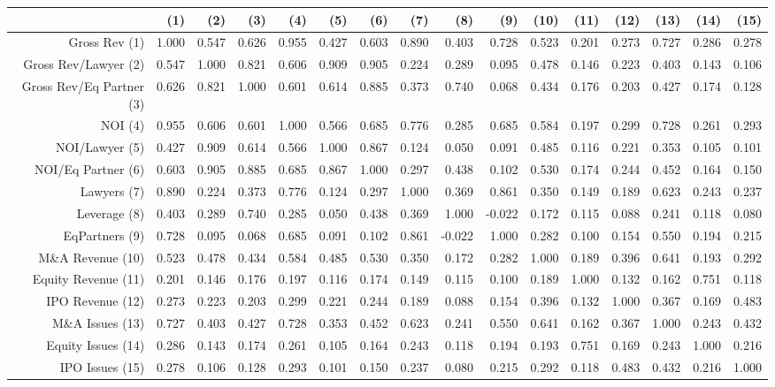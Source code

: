 \begin{table}[ht]
\centering
\begin{tabular}{rrrrrrrrrrrrrrrr}
  \hline
 & (1) & (2) & (3) & (4) & (5) & (6) & (7) & (8) & (9) & (10) & (11) & (12) & (13) & (14) & (15) \\ 
  \hline
Gross Rev (1) & 1.000 & 0.547 & 0.626 & 0.955 & 0.427 & 0.603 & 0.890 & 0.403 & 0.728 & 0.523 & 0.201 & 0.273 & 0.727 & 0.286 & 0.278 \\ 
  Gross Rev/Lawyer (2) & 0.547 & 1.000 & 0.821 & 0.606 & 0.909 & 0.905 & 0.224 & 0.289 & 0.095 & 0.478 & 0.146 & 0.223 & 0.403 & 0.143 & 0.106 \\ 
  Gross Rev/Eq Partner (3) & 0.626 & 0.821 & 1.000 & 0.601 & 0.614 & 0.885 & 0.373 & 0.740 & 0.068 & 0.434 & 0.176 & 0.203 & 0.427 & 0.174 & 0.128 \\ 
  NOI (4) & 0.955 & 0.606 & 0.601 & 1.000 & 0.566 & 0.685 & 0.776 & 0.285 & 0.685 & 0.584 & 0.197 & 0.299 & 0.728 & 0.261 & 0.293 \\ 
  NOI/Lawyer (5) & 0.427 & 0.909 & 0.614 & 0.566 & 1.000 & 0.867 & 0.124 & 0.050 & 0.091 & 0.485 & 0.116 & 0.221 & 0.353 & 0.105 & 0.101 \\ 
  NOI/Eq Partner (6) & 0.603 & 0.905 & 0.885 & 0.685 & 0.867 & 1.000 & 0.297 & 0.438 & 0.102 & 0.530 & 0.174 & 0.244 & 0.452 & 0.164 & 0.150 \\ 
  Lawyers (7) & 0.890 & 0.224 & 0.373 & 0.776 & 0.124 & 0.297 & 1.000 & 0.369 & 0.861 & 0.350 & 0.149 & 0.189 & 0.623 & 0.243 & 0.237 \\ 
  Leverage (8) & 0.403 & 0.289 & 0.740 & 0.285 & 0.050 & 0.438 & 0.369 & 1.000 & -0.022 & 0.172 & 0.115 & 0.088 & 0.241 & 0.118 & 0.080 \\ 
  EqPartners (9) & 0.728 & 0.095 & 0.068 & 0.685 & 0.091 & 0.102 & 0.861 & -0.022 & 1.000 & 0.282 & 0.100 & 0.154 & 0.550 & 0.194 & 0.215 \\ 
  M\&A Revenue (10) & 0.523 & 0.478 & 0.434 & 0.584 & 0.485 & 0.530 & 0.350 & 0.172 & 0.282 & 1.000 & 0.189 & 0.396 & 0.641 & 0.193 & 0.292 \\ 
  Equity Revenue (11) & 0.201 & 0.146 & 0.176 & 0.197 & 0.116 & 0.174 & 0.149 & 0.115 & 0.100 & 0.189 & 1.000 & 0.132 & 0.162 & 0.751 & 0.118 \\ 
  IPO Revenue (12) & 0.273 & 0.223 & 0.203 & 0.299 & 0.221 & 0.244 & 0.189 & 0.088 & 0.154 & 0.396 & 0.132 & 1.000 & 0.367 & 0.169 & 0.483 \\ 
  M\&A Issues (13) & 0.727 & 0.403 & 0.427 & 0.728 & 0.353 & 0.452 & 0.623 & 0.241 & 0.550 & 0.641 & 0.162 & 0.367 & 1.000 & 0.243 & 0.432 \\ 
  Equity Issues (14) & 0.286 & 0.143 & 0.174 & 0.261 & 0.105 & 0.164 & 0.243 & 0.118 & 0.194 & 0.193 & 0.751 & 0.169 & 0.243 & 1.000 & 0.216 \\ 
  IPO Issues (15) & 0.278 & 0.106 & 0.128 & 0.293 & 0.101 & 0.150 & 0.237 & 0.080 & 0.215 & 0.292 & 0.118 & 0.483 & 0.432 & 0.216 & 1.000 \\ 
   \hline
\end{tabular}
\end{table}
